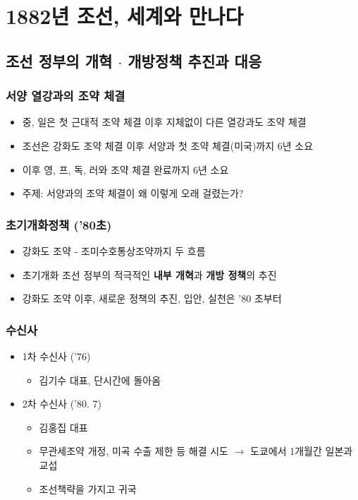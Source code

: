 \section{1882년 조선, 세계와 만나다}

\subsection{조선 정부의 개혁 $\cdot$ 개방정책 추진과 대응}

\subsubsection*{서양 열강과의 조약 체결}
\begin{itemize}
    \item 중, 일은 첫 근대적 조약 체결 이후 지체없이 다른 열강과도 조약 체결
    \item 조선은 강화도 조약 체결 이후 서양과 첫 조약 체결(미국)까지 6년 소요
    \item 이후 영, 프, 독, 러와 조약 체결 완료까지 6년 소요
    \item 주제: 서양과의 조약 체결이 왜 이렇게 오래 걸렸는가?
\end{itemize}

\subsubsection*{초기개화정책 ('80초)}
\begin{itemize}
    \item 강화도 조약 - 조미수호통상조약까지 두 흐름
    \item 초기개화 조선 정부의 적극적인 \textbf{내부 개혁}과 \textbf{개방 정책}의 추진
    \item 강화도 조약 이후, 새로운 정책의 추진, 입안, 실천은 '80 초부터
\end{itemize}

\subsubsection*{수신사}
\begin{itemize}
    \item 1차 수신사 ('76)
    \begin{itemize}
        \item 김기수 대표, 단시간에 돌아옴
    \end{itemize}
    \item 2차 수신사 ('80. 7)
    \begin{itemize}
        \item 김홍집 대표
        \item 무관세조약 개정, 미곡 수출 제한 등 해결 시도 $\rightarrow$ 도쿄에서 1개월간 일본과 교섭
        \item 조선책략을 가지고 귀국
    \end{itemize}
\end{itemize}

